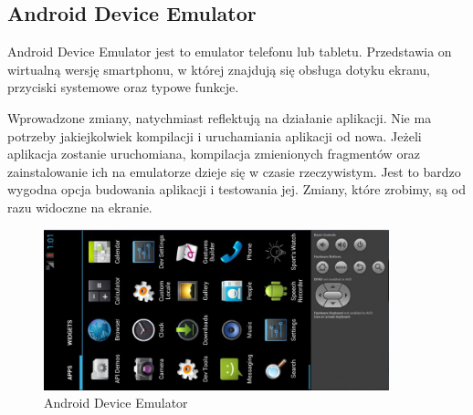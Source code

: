 \subsection{Android Device Emulator}
\label{c223}

Android Device Emulator jest to emulator telefonu lub tabletu. Przedstawia on wirtualną wersję smartphonu, w której znajdują się obsługa dotyku ekranu, przyciski systemowe oraz typowe funkcje.

Wprowadzone zmiany, natychmiast reflektują na działanie aplikacji. Nie ma potrzeby jakiejkolwiek kompilacji i uruchamiania aplikacji od nowa. Jeżeli aplikacja zostanie uruchomiana, kompilacja zmienionych fragmentów oraz zainstalowanie ich na emulatorze dzieje się w czasie rzeczywistym. Jest to bardzo wygodna opcja budowania aplikacji i testowania jej. Zmiany, które zrobimy, są od razu widoczne na ekranie.

\begin{figure}[H] 
\centering\includegraphics[width=10cm]{figures/emulator}
\caption{Android Device Emulator}
\end{figure}



